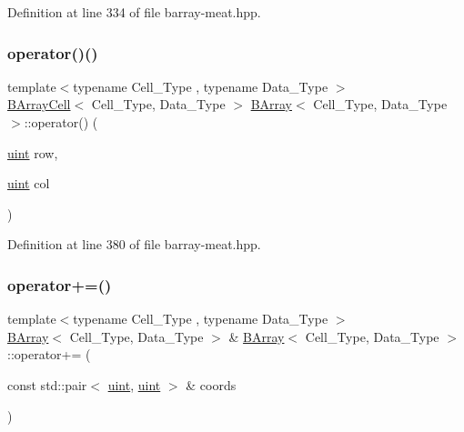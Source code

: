 Definition at line 334 of file barray-\/meat.\+hpp.

\mbox{\label{class_b_array_a8ddd0f172972420dce2cfce014126dba}} 
\subsubsection{\texorpdfstring{operator()()}{operator()()}}
{\footnotesize\ttfamily template$<$typename Cell\+\_\+\+Type , typename Data\+\_\+\+Type $>$ \\
\hyperlink{class_b_array_cell}{B\+Array\+Cell}$<$ Cell\+\_\+\+Type, Data\+\_\+\+Type $>$ \hyperlink{class_b_array}{B\+Array}$<$ Cell\+\_\+\+Type, Data\+\_\+\+Type $>$\+::operator() (\begin{DoxyParamCaption}\item[{\hyperlink{typedefs_8hpp_a91ad9478d81a7aaf2593e8d9c3d06a14}{uint}}]{row,  }\item[{\hyperlink{typedefs_8hpp_a91ad9478d81a7aaf2593e8d9c3d06a14}{uint}}]{col }\end{DoxyParamCaption})\hspace{0.3cm}{\ttfamily [inline]}}



Definition at line 380 of file barray-\/meat.\+hpp.

\mbox{\label{class_b_array_a706ee6da2f9a232970d286ccdd944d50}} 
\subsubsection{\texorpdfstring{operator+=()}{operator+=()}}
{\footnotesize\ttfamily template$<$typename Cell\+\_\+\+Type , typename Data\+\_\+\+Type $>$ \\
\hyperlink{class_b_array}{B\+Array}$<$ Cell\+\_\+\+Type, Data\+\_\+\+Type $>$ \& \hyperlink{class_b_array}{B\+Array}$<$ Cell\+\_\+\+Type, Data\+\_\+\+Type $>$\+::operator+= (\begin{DoxyParamCaption}\item[{const std\+::pair$<$ \hyperlink{typedefs_8hpp_a91ad9478d81a7aaf2593e8d9c3d06a14}{uint}, \hyperlink{typedefs_8hpp_a91ad9478d81a7aaf2593e8d9c3d06a14}{uint} $>$ \&}]{coords }\end{DoxyParamCaption})\hspace{0.3cm}{\ttfamily [inline]}}




